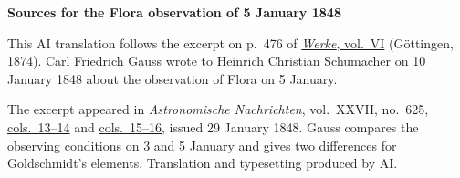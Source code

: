 \clearpage\thispagestyle{empty}
\begin{center}\textbf{Sources for the Flora observation of 5 January 1848}\end{center}
\noindent This AI translation follows the excerpt on p.~476 of \href{https://gdz.sub.uni-goettingen.de/id/PPN236007467}{\textit{Werke}, vol.~VI} (Göttingen, 1874). Carl Friedrich Gauss wrote to Heinrich Christian Schumacher on 10 January 1848 about the observation of Flora on 5 January.
\par\smallskip\noindent The excerpt appeared in \textit{Astronomische Nachrichten}, vol.~XXVII, no.~625, \href{https://api.digitale-sammlungen.de/iiif/image/v2/bsb10049452_00015/full/1800,/0/default.jpg}{cols.~13--14} and \href{https://api.digitale-sammlungen.de/iiif/image/v2/bsb10049452_00016/full/1800,/0/default.jpg}{cols.~15--16}, issued 29 January 1848. Gauss compares the observing conditions on 3 and 5 January and gives two differences for Goldschmidt’s elements. Translation and typesetting produced by AI.
\clearpage
